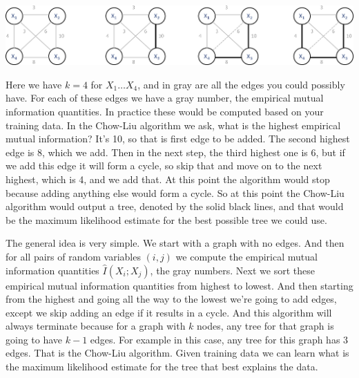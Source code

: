 {\centering\includegraphics[scale=0.4]{Chow_Liu4a} \par}

Here we have $k=4$ for $X_1 \dots X_4$, and in gray are all the edges you could possibly have. For each of these edges we have a gray number, the empirical mutual information quantities. In practice these would be computed based on your training data. In the Chow-Liu algorithm we ask, what is the highest empirical mutual information? It's 10, so that is first edge to be added. The second highest edge is 8, which we add. Then in the next step, the third highest one is 6, but if we add this edge it will form a cycle, so skip that and move on to the next highest, which is 4, and we add that. At this point the algorithm would stop because adding anything else would form a cycle. So at this point the Chow-Liu algorithm would output a tree, denoted by the solid black lines, and that would be the maximum likelihood estimate for the best possible tree we could use. 

The general idea is very simple. We start with a graph with no edges. And then for all pairs of random variables $(i,j)$ we compute the empirical mutual information quantities $\widehat{I}(X_i; X_j)$, the gray numbers. Next we sort these empirical mutual information quantities from highest to lowest. And then starting from the highest and going all the way to the lowest we're going to add edges, except we skip adding an edge if it results in a cycle. And this algorithm will always terminate because for a graph with $k$ nodes, any tree for that graph is going to have $k-1$ edges. For example in this case, any tree for this graph has 3 edges. That is the Chow-Liu algorithm. Given training data we can learn what is the maximum likelihood estimate for the tree that best explains the data. 


